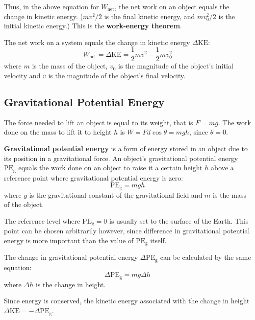 \documentclass{article}
\newcommand{\definition}[1]{\begin{tcolorbox}[colback=red!5!white,colframe=red!75!black,parbox=false] #1 \end{tcolorbox}}
\newcommand{\theorem}[2]{\begin{tcolorbox}[title={#1},colback=blue!5!white,colframe=blue!75!black,parbox=false] #2 \end{tcolorbox}}
\begin{document}
Thus, in the above equation for $W_{\text{net}}$, the net work on an object equals the change in kinetic energy. ($mv^2/2$ is the final kinetic energy, and $mv_0^2/2$ is the initial kinetic energy.) This is the \textbf{work-energy theorem}.

\theorem{Work-energy theorem}{The net work on a system equals the change in kinetic energy $\Delta \text{KE}$:
\begin{equation*}
	W_{\text{net}}
	=\Delta \text{KE}
	=\frac12mv^2-\frac12mv_0^2
\end{equation*}
where $m$ is the mass of the object, $v_0$ is the magnitude of the object's initial velocity and $v$ is the magnitude of the object's final velocity.}

\subsection{Gravitational Potential Energy}

The force needed to lift an object is equal to its weight, that is $F=mg$. The work done on the mass to lift it to height $h$ is $W=Fd\cos\theta=mgh$, since $\theta=0$.

\definition{\textbf{Gravitational potential energy} is a form of energy stored in an object due to its position in a gravitational force. An object's gravitational potential energy $\text{PE}_\text{g}$ equals the work done on an object to raise it a certain height $h$ above a reference point where gravitational potential energy is zero:
\begin{equation*}
	\text{PE}_{\text{g}}=mgh
\end{equation*}
where $g$ is the gravitational constant of the gravitational field and $m$ is the mass of the object.}

The reference level where $\text{PE}_\text{g}=0$ is usually set to the surface of the Earth. This point can be chosen arbitrarily however, since difference in gravitational potential energy is more important than the value of $\text{PE}_\text{g}$ itself.

The change in gravitational potential energy $\Delta \text{PE}_\text{g}$ can be calculated by the same equation:
\begin{equation*}
    \Delta \text{PE}_\text{g}=mg\Delta h
\end{equation*}
where $\Delta h$ is the change in height.

Since energy is conserved, the kinetic energy associated with the change in height $\Delta \text{KE}=-\Delta \text{PE}_\text{g}$.
\end{document}
